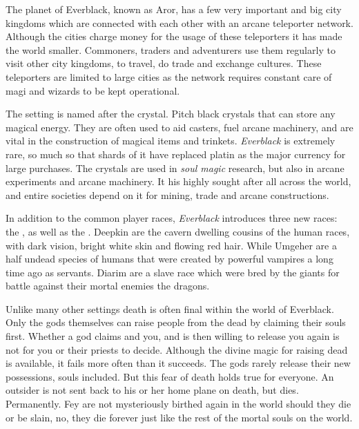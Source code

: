\begin{enumerate}
  The planet of Everblack, known as Aror, has a
 few very important and big city kingdoms which are connected with each other
 with an arcane teleporter network. Although the cities charge money for the
 usage of these teleporters it has made the world smaller. Commoners, traders
 and adventurers use them regularly to visit other city kingdoms, to travel,
 do trade and exchange cultures. These teleporters are limited to large cities
 as the network requires constant care of magi and wizards to be kept
 operational.

  The setting is named after the 
 crystal. Pitch black crystals that can store any magical energy. They are
 often used to aid casters, fuel arcane machinery, and are vital in the
 construction of magical items and trinkets. \emph{Everblack} is extremely
 rare, so much so that shards of it have replaced platin as the major currency
 for large purchases. The crystals are used in \emph{soul magic} research, but
 also in arcane experiments and arcane machinery. It his highly sought after
 all across the world, and entire societies depend on it for mining, trade and
 arcane constructions.

  In addition to the common player races, \emph{Everblack}
 introduces three new races: the , 
 as well as the . Deepkin are the cavern dwelling cousins
 of the human races, with dark vision, bright white skin and flowing red
 hair. While Umgeher are a half undead species of humans that were created by
 powerful vampires a long time ago as servants. Diarim are a slave race which
 were bred by the giants for battle against their mortal enemies the dragons.

  Unlike many other settings death is often final
 within the world of Everblack. Only the gods themselves can raise people from
 the dead by claiming their souls first. Whether a god claims and you, and is
 then willing to release you again is not for you or their priests to decide.
 Although the divine magic for raising dead is available, it fails more often
 than it succeeds. The gods rarely release their new possessions, souls
 included. But this fear of death holds true for everyone. An outsider is not
 sent back to his or her home plane on death, but dies. Permanently. Fey are
 not mysteriously birthed again in the world should they die or be slain, no,
 they die forever just like the rest of the mortal souls on the world.
\end{enumerate}

